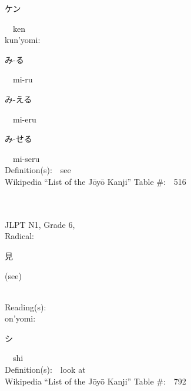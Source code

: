 \begin{multicols}{2}
{\hspace*{2em}}{\begin{CJK}{UTF8}{min} ケン \end{CJK}}\ \ ken\ \ \\
{\hspace*{1em}}kun'yomi:\ \ \\
{\hspace*{2em}}{\begin{CJK}{UTF8}{min} み-る \end{CJK}}\ \ mi-ru\ \ \\
{\hspace*{2em}}{\begin{CJK}{UTF8}{min} み-える \end{CJK}}\ \ mi-eru\ \ \\
{\hspace*{2em}}{\begin{CJK}{UTF8}{min} み-せる \end{CJK}}\ \ mi-seru\ \ \\
Definition(s):\ \ see \\
Wikipedia ``List of the J\=oy\=o Kanji'' Table \#:\ \ 516 \\
\ \ \\
{\fontsize{34pt}{40pt}  }\ \ \\  %
{JLPT N1, Grade 6, \\Radical:\ \ {\begin{CJK}{UTF8}{min} 見 \end{CJK}} (see) } \\
Reading(s):\ \ \\
{\hspace*{1em}}on'yomi:\ \ \\
{\hspace*{2em}}{\begin{CJK}{UTF8}{min} シ \end{CJK}}\ \ shi\ \ \\
Definition(s):\ \ look at \\
Wikipedia ``List of the J\=oy\=o Kanji'' Table \#:\ \ 792 \\
\ \ \\
{\fontsize{34pt}{40pt}  }\ \ \\  %

\end{multicols}
